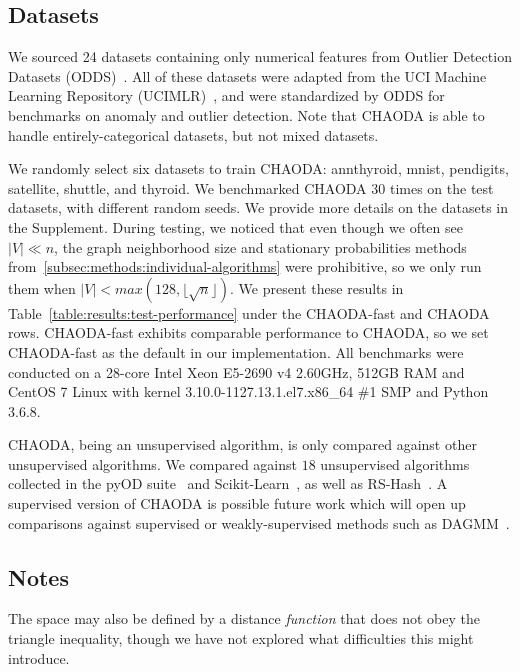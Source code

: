 \subsection{Datasets}
\label{subsec:methods:datasets}

We sourced 24 datasets containing only numerical features from Outlier Detection Datasets (ODDS)~\cite{rayana2016odds}.
All of these datasets were adapted from the UCI Machine Learning Repository (UCIMLR)~\cite{UCIMLR}, and were standardized by ODDS for benchmarks on anomaly and outlier detection.
Note that CHAODA is able to handle entirely-categorical datasets, but not mixed datasets.

We randomly select six datasets to train CHAODA: annthyroid, mnist, pendigits, satellite, shuttle, and thyroid.
We benchmarked CHAODA 30 times on the test datasets, with different random seeds.
We provide more details on the datasets in the Supplement.
During testing, we noticed that even though we often see $|V| \ll n $, the graph neighborhood size and stationary probabilities methods from~\ref{subsec:methods:individual-algorithms} were prohibitive, so we only run them when $|V| < max(128, \lfloor \sqrt n \rfloor)$.
We present these results in Table~\ref{table:results:test-performance} under the CHAODA-fast and CHAODA rows.
CHAODA-fast exhibits comparable performance to CHAODA, so we set CHAODA-fast as the default in our implementation.
All benchmarks were conducted on a 28-core Intel Xeon E5-2690 v4 2.60GHz, 512GB RAM and CentOS 7 Linux with kernel 3.10.0-1127.13.1.el7.x86\_64 \#1 SMP and Python 3.6.8.

CHAODA, being an unsupervised algorithm, is only compared against other unsupervised algorithms.
We compared against $18$ unsupervised algorithms collected in the pyOD suite~\cite{zhao2019pyod} and Scikit-Learn~\cite{pedregosa2011scikit}, as well as RS-Hash~\cite{sathe2016subspace}.
A supervised version of CHAODA is possible future work which will open up comparisons against supervised or weakly-supervised methods such as DAGMM~\cite{zong2018deep}.


\subsection{Notes}
\label{subsec:methods:notes}

The space may also be defined by a distance \textit{function} that does not obey the triangle inequality, though we have not explored what difficulties this might introduce.

